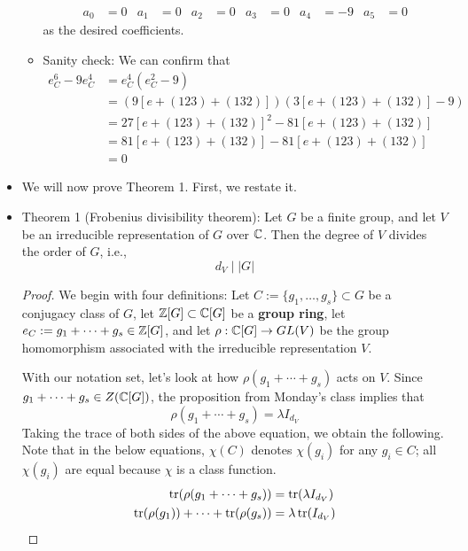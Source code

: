 \documentclass[../notes.tex]{subfiles}
\begin{document}
\begin{itemize}
\begin{itemize}
\begin{align*}
            a_0 &= 0&
            a_1 &= 0&
            a_2 &= 0&
            a_3 &= 0&
            a_4 &= -9&
            a_5 &= 0
        \end{align*}
        as the desired coefficients.
        \item Sanity check: We can confirm that
        \begin{align*}
            e_C^6-9e_C^4 &= e_C^4(e_C^2-9)\\
            &= (9[e+(123)+(132)])(3[e+(123)+(132)]-9)\\
            &= 27[e+(123)+(132)]^2-81[e+(123)+(132)]\\
            &= 81[e+(123)+(132)]-81[e+(123)+(132)]\\
            &= 0
        \end{align*}
    \end{itemize}
    \item We will now prove Theorem 1. First, we restate it.
    \item Theorem 1 (Frobenius divisibility theorem): Let $G$ be a finite group, and let $V$ be an irreducible representation of $G$ over $\mathbb{C}$. Then the degree of $V$ divides the order of $G$, i.e.,
    \begin{equation*}
        d_V \mid |G|
    \end{equation*}
    \begin{proof}
        We begin with four definitions: Let $C:=\{g_1,\dots,g_s\}\subset G$ be a conjugacy class of $G$, let $\mathbb{Z}[G]\subset\mathbb{C}[G]$ be a \textbf{group ring}, let $e_C:=g_1+\cdots+g_s\in\mathbb{Z}[G]$, and let $\rho:\mathbb{C}[G]\to GL(V)$ be the group homomorphism associated with the irreducible representation $V$.\par
        With our notation set, let's look at how $\rho(g_1+\cdots+g_s)$ acts on $V$. Since $g_1+\cdots+g_s\in Z(\mathbb{C}[G])$, the proposition from Monday's class implies that
        \begin{equation*}
            \rho(g_1+\cdots+g_s) = \lambda I_{d_V}
        \end{equation*}
        Taking the trace of both sides of the above equation, we obtain the following. Note that in the below equations, $\chi(C)$ denotes $\chi(g_i)$ for any $g_i\in C$; all $\chi(g_i)$ are equal because $\chi$ is a class function. 
        \begin{align*}
            \tr(\rho(g_1+\cdots+g_s)) &= \tr(\lambda I_{d_V})\\
            \tr(\rho(g_1))+\cdots+\tr(\rho(g_s)) &= \lambda\tr(I_{d_V})\\

\end{align*}
\end{proof}
\end{itemize}
\end{document}
